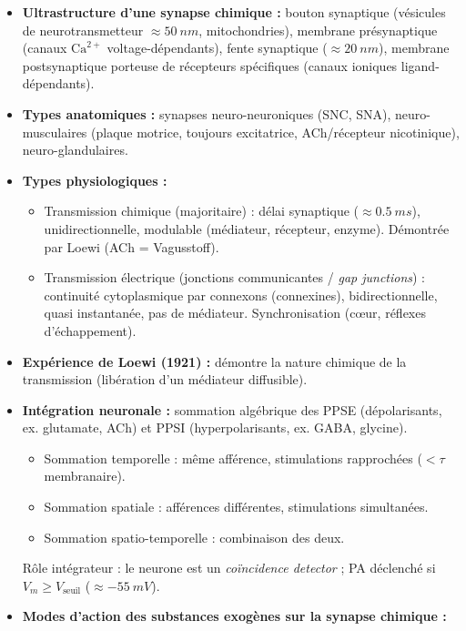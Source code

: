 \documentclass[11pt]{article}
\newcommand{\cle}[1]{{\popxbold\color{popdark}#1}}
\newcounter{popsec}
\newcounter{popsub}
\newcommand{\courssub}[1]{%
  \stepcounter{popsub}%
  \par\vspace{9pt}\noindent{\popxbold\fontsize{11.5}{13}\selectfont\color{popink}{\color{poporange}\thepopsec.\thepopsub}\hspace{6pt}#1}\par\nopagebreak\vspace{4pt}
}
\begin{document}
\courssub{Ressources à mobiliser}

\begin{aretenir}
\begin{itemize}
\item \textbf{Ultrastructure d'une synapse chimique :} bouton synaptique (vésicules de neurotransmetteur $\approx \SI{50}{nm}$, mitochondries), membrane présynaptique (canaux $\text{Ca}^{2+}$ voltage-dépendants), fente synaptique ($\approx \SI{20}{nm}$), membrane postsynaptique porteuse de récepteurs spécifiques (canaux ioniques ligand-dépendants).
\item \textbf{Types anatomiques :} synapses neuro-neuroniques (SNC, SNA), neuro-musculaires (plaque motrice, toujours excitatrice, ACh/récepteur nicotinique), neuro-glandulaires.
\item \textbf{Types physiologiques :}
      \begin{itemize}
      \item \cle{Transmission chimique} (majoritaire) : délai synaptique ($\approx \SI{0,5}{ms}$), unidirectionnelle, modulable (médiateur, récepteur, enzyme). Démontrée par Loewi (ACh = Vagusstoff).
      \item \cle{Transmission électrique} (jonctions communicantes / \emph{gap junctions}) : continuité cytoplasmique par connexons (connexines), bidirectionnelle, quasi instantanée, pas de médiateur. Synchronisation (cœur, réflexes d'échappement).
      \end{itemize}
\item \textbf{Expérience de Loewi (1921) :} démontre la nature \cle{chimique} de la transmission (libération d'un médiateur diffusible).
\item \textbf{Intégration neuronale :} sommation algébrique des PPSE (dépolarisants, ex. glutamate, ACh) et PPSI (hyperpolarisants, ex. GABA, glycine).
      \begin{itemize}
      \item \cle{Sommation temporelle} : même afférence, stimulations rapprochées ($<\tau$ membranaire).
      \item \cle{Sommation spatiale} : afférences différentes, stimulations simultanées.
      \item \cle{Sommation spatio-temporelle} : combinaison des deux.
      \end{itemize}
      Rôle intégrateur : le neurone est un \emph{coïncidence detector} ; PA déclenché si $V_m \ge V_{\text{seuil}}$ ($\approx \SI{-55}{mV}$).
\item \textbf{Modes d'action des substances exogènes sur la synapse chimique :}

\end{itemize}
\end{aretenir}
\end{document}
